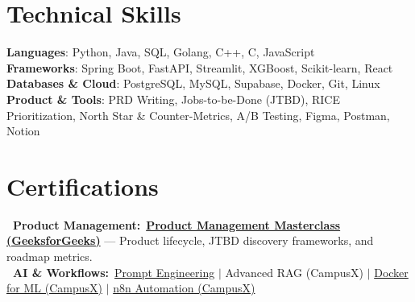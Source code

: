 \documentclass[letterpaper,10pt]{article}
\begin{document}
\section{Technical Skills}
 \begin{itemize}[leftmargin=0.15in, label={}]
    \small{\item{
     \textbf{Languages}{: Python, Java, SQL, Golang, C++, C, JavaScript} \\
     \textbf{Frameworks}{: Spring Boot, FastAPI, Streamlit, XGBoost, Scikit-learn, React} \\
     \textbf{Databases \& Cloud}{: PostgreSQL, MySQL, Supabase, Docker, Git, Linux} \\
     \textbf{Product \& Tools}{: PRD Writing, Jobs-to-be-Done (JTBD), RICE Prioritization, North Star \& Counter-Metrics, A/B Testing, Figma, Postman, Notion}
    }}
 \end{itemize}


\section{Certifications}
 \begin{itemize}[leftmargin=0.15in, label={}]
    \small{\item{
     \textbf{\textbullet\ Product Management:}\ \href{https://drive.google.com/file/d/199XpTr2wp9waMzs4I5PiToiuOoKuQvJK/view?usp=drive_link}{\textbf{Product Management Masterclass (GeeksforGeeks)}} --- Product lifecycle, JTBD discovery frameworks, and roadmap metrics. \\
     \textbf{\textbullet\ AI \& Workflows:}\ \href{https://drive.google.com/file/d/1NqDNLf16tuThGlGOO2cFp1IxiTjWQCFP/view?usp=drive_link}{Prompt Engineering} $|$ Advanced RAG (CampusX) $|$ \href{https://drive.google.com/file/d/16eh0ob2JVliyVaThmYrngZXz-AVuKIV0/view?usp=drive_link}{Docker for ML (CampusX)} $|$ \href{https://drive.google.com/file/d/1phqwetDgCSHg1ykofHUi9J4a7JWGJ74Y/view?usp=drive_link}{n8n Automation (CampusX)}
    }}
 \end{itemize}

\end{document}
